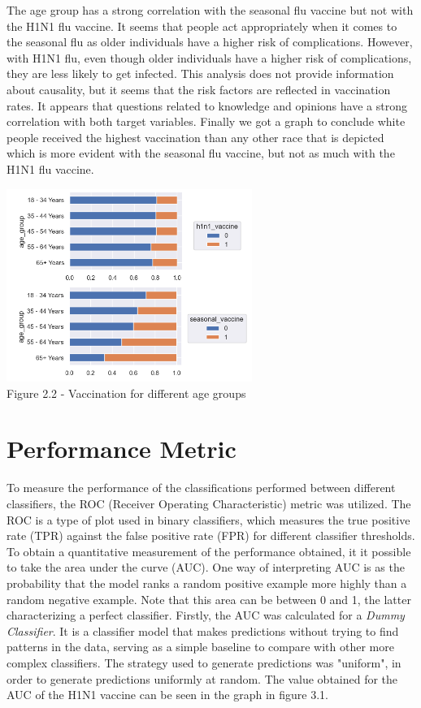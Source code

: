 \documentclass{IEEEtran}
\begin{document}
The age group has a strong correlation with the seasonal flu vaccine but not with the H1N1 flu vaccine. It seems that people act appropriately when it comes to the seasonal flu as older individuals have a higher risk of complications. However, with H1N1 flu, even though older individuals have a higher risk of complications, they are less likely to get infected. This analysis does not provide information about causality, but it seems that the risk factors are reflected in vaccination rates.
It appears that questions related to knowledge and opinions have a strong correlation with both target variables. Finally we got a  graph to conclude white people received the highest vaccination than any other race that is depicted which is more evident with the seasonal flu vaccine, but not as much with the H1N1 flu vaccine. 

\begin{center}
    \includegraphics[width = 8cm]{figures/Age.png}\\
    Figure 2.2 - Vaccination for different age groups
\end{center}



\section{Performance Metric}
To measure the performance of the classifications performed between different classifiers, the ROC (Receiver Operating Characteristic) metric was utilized. The ROC is a type of plot used in binary classifiers, which measures the true positive rate (TPR) against the false positive rate (FPR) for different classifier thresholds. To obtain a quantitative measurement of the performance obtained, it it possible to take the area under the curve (AUC). One way of interpreting AUC is as the probability that the model ranks a random positive example more highly than a random negative example. Note that this area can be between 0 and 1, the latter characterizing a perfect classifier.
Firstly, the AUC was calculated for a \textit{Dummy Classifier}. It is a classifier model that makes predictions without trying to find patterns in the data, serving as a simple baseline to compare with other more complex classifiers. The strategy used to generate predictions was "uniform", in order to generate predictions uniformly at random. The value obtained for the AUC of the H1N1 vaccine can be seen in the graph in figure 3.1.
\end{document}
